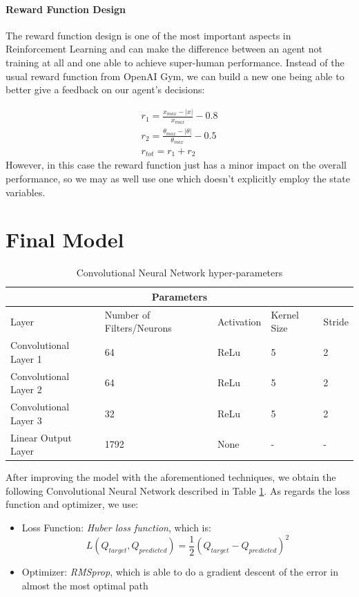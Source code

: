 \documentclass[11pt]{article}
\begin{document}
\paragraph{Reward Function Design}
The reward function design is one of the most important aspects in Reinforcement Learning and can make the difference between an agent not training at all and one able to achieve super-human performance. Instead of the usual reward function from OpenAI Gym, we can build a new one being able to better give a feedback on our agent's decisions:

\begin{equation}
\label{eq:reward}
\begin{aligned}
	r_1 = \frac{x_{max} - |x|}{x_{max}} - 0.8 \\
	r_2 = \frac{\theta_{max} - |\theta|}{\theta_{max}} - 0.5 \\
	r_{tot} = r_1 + r_2 
\end{aligned}
\end{equation}
However, in this case the reward function just has a minor impact on the overall performance, so we may as well use one which doesn't explicitly employ the state variables.

\section{Final Model}
\begin{table}[h!]
	\centering
	\begin{tabular}{ |p{4cm}|p{3cm}|p{2cm}|p{1.5cm}|p{1.2cm}|  }
		\hline
		\multicolumn{5}{|c|}{Parameters} \\
		\hline
		Layer & Number of Filters/Neurons & Activation & Kernel Size & Stride \\
		\hline
		Convolutional Layer 1 & 64 & ReLu & 5 & 2\\
		\hline
		Convolutional Layer 2 & 64 & ReLu & 5 & 2 \\
		\hline
		Convolutional Layer 3 & 32 & ReLu & 5 & 2 \\
		\hline
		Linear Output Layer  & 1792 & None & - & - \\
		\hline
	\end{tabular}
	\label{table:NeuralNetwork}
	\caption{Convolutional Neural Network hyper-parameters}
\end{table}
	
After improving the model with the aforementioned techniques, we obtain the following Convolutional Neural Network described in Table \ref{table:NeuralNetwork}. As regards the loss function and optimizer, we use:
\begin{itemize}
	\item Loss Function: \textit{Huber loss function}, which is: 
	\begin{equation}
		L(Q_{target}, Q_{predicted}) = \frac{1}{2}(Q_{target}-Q_{predicted})^2
	\end{equation}
	\item Optimizer: \textit{RMSprop}, which is able to do a gradient descent of the error in almost the most optimal path
\end{itemize}
\end{document}
